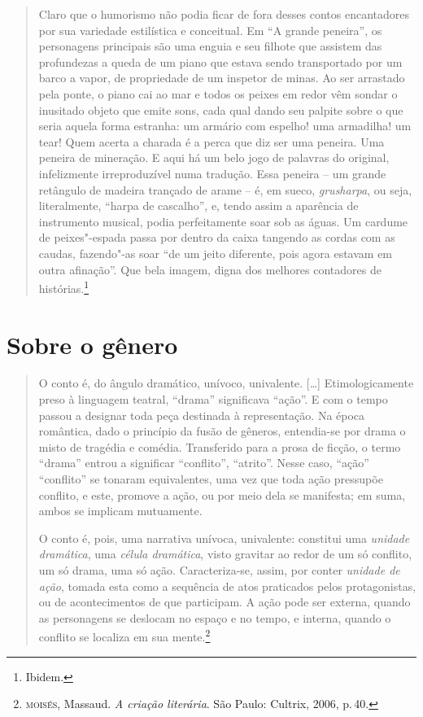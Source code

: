 \begin{quote}
Claro que o humorismo não podia ficar de fora desses contos encantadores
por sua variedade estilística e conceitual. Em ``A grande
peneira'', os personagens principais são uma enguia e seu filhote que
assistem das profundezas a queda de um piano que estava sendo
transportado por um barco a vapor, de propriedade de um inspetor de
minas. Ao ser arrastado pela ponte, o piano cai ao mar e todos os
peixes em redor vêm sondar o inusitado objeto que emite sons, cada qual
dando seu palpite sobre o que seria aquela forma estranha: um armário
com espelho! uma armadilha! um tear! Quem acerta a charada é a perca
que diz ser uma peneira. Uma peneira de mineração. E aqui há um belo
jogo de palavras do original, infelizmente irreproduzível numa
tradução. Essa peneira -- um grande retângulo de madeira trançado
de arame -- é, em sueco, \textit{grusharpa}, ou seja, literalmente,
``harpa de cascalho'', e, tendo assim a aparência de instrumento musical,
podia perfeitamente soar sob as águas. Um cardume de peixes"-espada
passa por dentro da caixa tangendo as cordas com as caudas,
fazendo"-as soar ``de um jeito diferente, pois agora estavam em outra
afinação''. Que bela imagem, digna dos melhores contadores de
histórias.\footnote{Ibidem.}
\end{quote}


\section{Sobre o gênero}

\begin{quote}
O conto é, do ângulo dramático, unívoco, univalente. [\ldots]
Etimologicamente preso à linguagem teatral,
``drama'' significava ``ação''. E com o tempo passou a designar
toda peça destinada à representação. Na época romântica, dado o
princípio da fusão de gêneros, entendia-se por drama o misto de
tragédia e comédia. Transferido para a prosa de ficção, o termo
``drama'' entrou a significar ``conflito'', ``atrito''. Nesse caso,
``ação'' ``conflito'' se tonaram equivalentes, uma vez que toda
ação pressupõe conflito, e este, promove a ação, ou por meio dela
se manifesta; em suma, ambos se implicam mutuamente.

O conto é, pois, uma narrativa unívoca, univalente: constitui
uma \textit{unidade dramática}, uma \textit{célula dramática}, visto gravitar ao
redor de um só conflito, um só drama, uma só ação. Caracteriza-se,
assim, por conter \textit{unidade de ação}, tomada esta como a sequência de atos praticados pelos protagonistas, ou de acontecimentos de
que participam. A ação pode ser externa, quando as personagens se
deslocam no espaço e no tempo, e interna, quando o conflito se
localiza em sua mente.\footnote{\textsc{moisés}, Massaud. \textit{A criação literária}. São Paulo: Cultrix, 2006, p.\,40.}
\end{quote}

